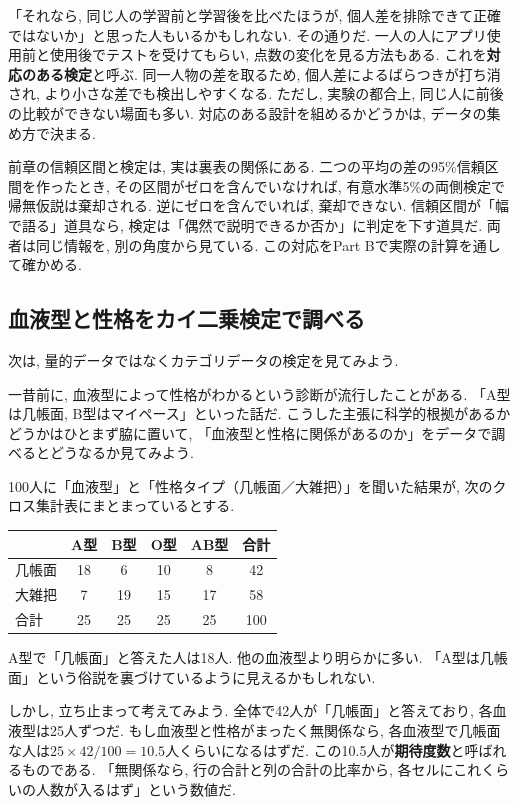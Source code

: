     「それなら, 同じ人の学習前と学習後を比べたほうが, 個人差を排除できて正確ではないか」と思った人もいるかもしれない.
    その通りだ.
    一人の人にアプリ使用前と使用後でテストを受けてもらい, 点数の変化を見る方法もある.
    これを\textbf{対応のある検定}と呼ぶ.
    同一人物の差を取るため, 個人差によるばらつきが打ち消され, より小さな差でも検出しやすくなる.
    ただし, 実験の都合上, 同じ人に前後の比較ができない場面も多い.
    対応のある設計を組めるかどうかは, データの集め方で決まる.

    前章の信頼区間と検定は, 実は裏表の関係にある.
    二つの平均の差の95\%信頼区間を作ったとき, その区間がゼロを含んでいなければ,
    有意水準5\%の両側検定で帰無仮説は棄却される.
    逆にゼロを含んでいれば, 棄却できない.
    信頼区間が「幅で語る」道具なら, 検定は「偶然で説明できるか否か」に判定を下す道具だ.
    両者は同じ情報を, 別の角度から見ている.
    この対応をPart Bで実際の計算を通して確かめる.


  \subsection{血液型と性格をカイ二乗検定で調べる}

    次は, 量的データではなくカテゴリデータの検定を見てみよう.

    一昔前に, 血液型によって性格がわかるという診断が流行したことがある.
    「A型は几帳面, B型はマイペース」といった話だ.
    こうした主張に科学的根拠があるかどうかはひとまず脇に置いて,
    「血液型と性格に関係があるのか」をデータで調べるとどうなるか見てみよう.

    100人に「血液型」と「性格タイプ（几帳面／大雑把）」を聞いた結果が, 次のクロス集計表にまとまっているとする.

    \begin{center}
      \begin{tabular}{l|cccc|c}
             & A型 & B型 & O型 & AB型 & 合計 \\
      \hline
      几帳面 & 18  & 6   & 10  & 8    & 42 \\
      大雑把 & 7   & 19  & 15  & 17   & 58 \\
      \hline
      合計   & 25  & 25  & 25  & 25   & 100
      \end{tabular}
    \end{center}

    A型で「几帳面」と答えた人は18人.
    他の血液型より明らかに多い.
    「A型は几帳面」という俗説を裏づけているように見えるかもしれない.

    しかし, 立ち止まって考えてみよう.
    全体で42人が「几帳面」と答えており, 各血液型は25人ずつだ.
    もし血液型と性格がまったく無関係なら, 各血液型で几帳面な人は$25 \times 42/100 = 10.5$人くらいになるはずだ.
    この10.5人が\textbf{期待度数}と呼ばれるものである.
    「無関係なら, 行の合計と列の合計の比率から, 各セルにこれくらいの人数が入るはず」という数値だ.

